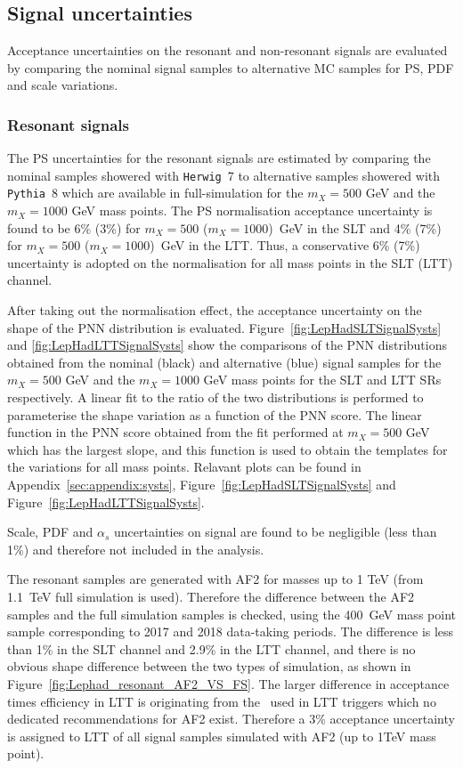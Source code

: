 \subsection{Signal uncertainties}
\label{sec:systematics_signal}

Acceptance uncertainties on the resonant and non-resonant signals 
are evaluated by comparing the nominal signal samples to alternative 
MC samples for PS, PDF and scale variations.

\subsubsection{Resonant signals}

The PS uncertainties for the resonant signals 
are estimated by comparing the nominal samples showered with 
\texttt{Herwig}~7 to alternative samples showered with \texttt{Pythia}~8 which are available 
in full-simulation for the $m_X= 500$ GeV and the $m_X=1000$ GeV mass points. 
The PS normalisation acceptance uncertainty is 
found to be 6\% (3\%) for $m_X=500$ ($m_X=1000$)~GeV 
in the SLT and 4\% (7\%) for $m_X= 500$ ($m_X=1000$)~GeV in the LTT. 
Thus, a conservative 6\% (7\%) uncertainty is adopted on the 
normalisation for all mass points in the SLT (LTT) channel.

After taking out the normalisation effect, the acceptance uncertainty on the 
shape of the PNN distribution is evaluated. 
Figure~\ref{fig:LepHadSLTSignalSysts} and \ref{fig:LepHadLTTSignalSysts} 
show the comparisons of the PNN distributions obtained from the 
nominal (black) and alternative (blue) signal samples for the  
$m_X= 500$ GeV and the $m_X=1000$ GeV mass points for the 
SLT and LTT SRs respectively. 
A linear fit to the ratio of the two distributions is 
performed to parameterise the shape variation as a function 
of the PNN score.
The linear function in the PNN score obtained from the fit 
performed at $m_X= 500$ GeV which has the largest slope, 
and this function is used to obtain the 
templates for the variations for all mass points. 
Relavant plots can be found in Appendix~\ref{sec:appendix:systs},
Figure~\ref{fig:LepHadSLTSignalSysts} and Figure~\ref{fig:LepHadLTTSignalSysts}. 

Scale, PDF and $\alpha_s$ uncertainties on signal are found to 
be negligible (less than 1\%) and therefore not included in the analysis. 

The resonant samples are generated with AF2 for masses up to 1 TeV (from \SI{1.1}{\TeV}
full simulation is used). Therefore the difference between the AF2 samples and
the full simulation samples is checked, using the 400~GeV mass point 
sample corresponding to 2017 and 2018 data-taking periods.  
The difference is less than 1\% in the SLT channel
and 2.9\% in the LTT channel, and there is no obvious shape
difference between the two types of simulation, as shown in
Figure~\ref{fig:Lephad_resonant_AF2_VS_FS}. 
The larger difference in acceptance times efficiency in 
LTT is originating from the \tauhad\ used in LTT triggers 
which no dedicated recommendations for AF2 exist.
Therefore a 3\% acceptance uncertainty is assigned to LTT of all signal
samples simulated with AF2 (up to 1TeV mass point).


